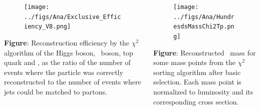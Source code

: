 \begin{frame}{}
\vspace{-.2cm}

\begin{columns}
\begin{column}{.50\textwidth}

\begin{figure}[!Hhtbp]
  \begin{center}
    \texttt{[image: ../figs/Ana/Exclusive\_Efficiency\_V8.png]}
  \end{center}
\end{figure}

\vspace{-.2cm}
\begin{block}{}
\scriptsize \textbf{Figure}: Reconstruction efficiency by the $\chi^{2}$ algorithm of the Higgs boson, \W~boson, top quark and \Tp, as the ratio of the number of events where the particle was correctly reconstructed to the number of events where jets could be matched to partons.
\end{block}
\end{column}

\begin{column}{.50\textwidth}

\begin{figure}[!Hhtbp]
  \begin{center}
    \texttt{[image: ../figs/Ana/HundresdsMassChi2Tp.png]}
  \end{center}
\end{figure}

\vspace{-.2cm}
\begin{block}{}
\scriptsize \textbf{Figure}: Reconstructed \Tp~mass for some mass points from the $\chi^{2}$ sorting algorithm after basic selection. Each mass point is normalized to luminosity and its corresponding cross section.
\end{block}
\end{column}

\end{columns}
\end{frame}


